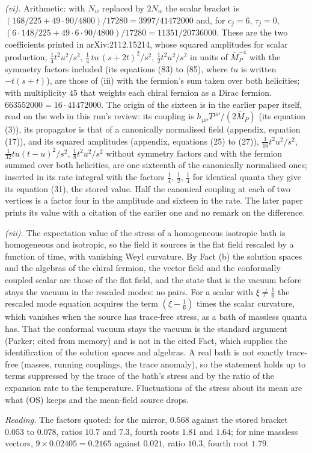 \emph{(vi).} Arithmetic: with $N_{w}$ replaced by $2N_{w}$ the scalar bracket is $(168/225 + 49 \cdot 90/4800)/17280 = 3997/41472000$ and, for $c_{j} = 6$, $\tau_{j} = 0$, $(6 \cdot 148/225 + 49 \cdot 6 \cdot 90/4800)/17280 = 11351/20736000$. These are the two coefficients printed in arXiv:2112.15214, whose squared amplitudes for scalar production, $\tfrac14 t^{2}u^{2}/s^{2}$, $\tfrac14\,tu\,(s + 2t)^{2}/s^{2}$, $\tfrac12 t^{2}u^{2}/s^{2}$ in units of $\bar{M}_{P}^{-4}$ with the symmetry factors included (its equations (83) to (85), where $tu$ is written $-t(s+t)$), are those of (iii) with the fermion's sum taken over both helicities; with multiplicity $45$ that weights each chiral fermion as a Dirac fermion. $663552000 = 16 \cdot 41472000$. The origin of the sixteen is in the earlier paper itself, read on the web in this run's review: its coupling is $h_{\mu\nu}T^{\mu\nu}/(2\bar{M}_{P})$ (its equation (3)), its propagator is that of a canonically normalised field (appendix, equation (17)), and its squared amplitudes (appendix, equations (25) to (27)), $\tfrac1{16}t^{2}u^{2}/s^{2}$, $\tfrac1{32}tu(t-u)^{2}/s^{2}$, $\tfrac18 t^{2}u^{2}/s^{2}$ without symmetry factors and with the fermion summed over both helicities, are one sixteenth of the canonically normalised ones; inserted in its rate integral with the factors $\tfrac14$, $\tfrac12$, $\tfrac14$ for identical quanta they give its equation (31), the stored value. Half the canonical coupling at each of two vertices is a factor four in the amplitude and sixteen in the rate. The later paper prints its value with a citation of the earlier one and no remark on the difference.

\emph{(vii).} The expectation value of the stress of a homogeneous isotropic bath is homogeneous and isotropic, so the field it sources is the flat field rescaled by a function of time, with vanishing Weyl curvature. By Fact (b) the solution spaces and the algebras of the chiral fermion, the vector field and the conformally coupled scalar are those of the flat field, and the state that is the vacuum before stays the vacuum in the rescaled modes: no pairs. For a scalar with $\xi \neq \tfrac16$ the rescaled mode equation acquires the term $(\xi - \tfrac16)$ times the scalar curvature, which vanishes when the source has trace-free stress, as a bath of massless quanta has. That the conformal vacuum stays the vacuum is the standard argument (Parker; cited from memory) and is not in the cited Fact, which supplies the identification of the solution spaces and algebras. A real bath is not exactly trace-free (masses, running couplings, the trace anomaly), so the statement holds up to terms suppressed by the trace of the bath's stress and by the ratio of the expansion rate to the temperature. Fluctuations of the stress about its mean are what (OS) keeps and the mean-field source drops.

\emph{Reading.} The factors quoted: for the mirror, $0.568$ against the stored bracket $0.053$ to $0.078$, ratios $10.7$ and $7.3$, fourth roots $1.81$ and $1.64$; for nine massless vectors, $9 \times 0.02405 = 0.2165$ against $0.021$, ratio $10.3$, fourth root $1.79$.
